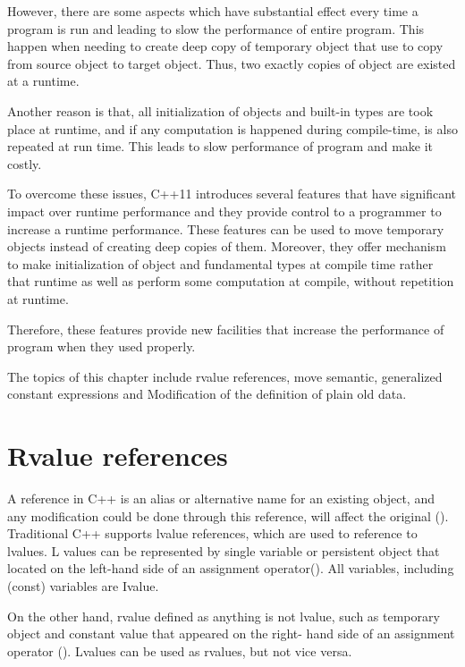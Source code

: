 \documentclass[11pt]{report}
\begin{document}
However, there are some aspects which have substantial effect every time a program is run and leading to slow the performance of entire program. This happen when needing to create deep copy of temporary object that use to copy from source object to target object. Thus, two exactly copies of object are existed at a runtime.

Another reason is that, all initialization of objects and built-in types are took place at runtime, and if any computation is happened during compile-time, is also repeated at run time. This leads to slow performance of program and make it costly.

To overcome these issues, C++11 introduces several features that have significant impact over runtime performance and they provide control to a programmer to increase a runtime performance.  These features can be used to move temporary objects instead of creating deep copies of them. Moreover, they offer mechanism to make initialization of object and fundamental types at compile time rather that runtime as well as perform some computation at compile, without repetition at runtime.

Therefore, these features provide new facilities that increase the performance of program when they used properly. 

The topics of this chapter include rvalue references, move semantic, generalized constant expressions and Modification of the definition of plain old data.
\newpage

\section{Rvalue references}
\label{section: Rvalue references}
A reference in C++ is an alias or alternative name for an existing object, and any modification could be done through this reference, will affect the original (\cite{Gregorie:professionalcpp}). Traditional C++ supports lvalue references, which are used to reference to lvalues. L values can be represented by single variable or persistent object that located on the left-hand side of an assignment operator(\cite{Gregorie:professionalcpp}). All variables, including (const) variables are Ivalue.

On the other hand, rvalue defined as anything is not lvalue, such as temporary object and constant value that appeared on the right- hand side of an assignment operator (\cite{Gregorie:professionalcpp}).  Lvalues can be used as rvalues, but not vice versa.
\end{document}
